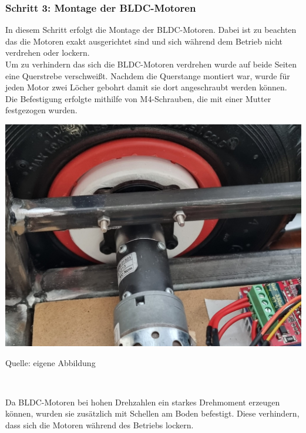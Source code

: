 \documentclass[ngerman,12pt,a4paper]{article}
\begin{document}
	\subsubsection*{Schritt 3: Montage der BLDC-Motoren}
	
	In diesem Schritt erfolgt die Montage der BLDC-Motoren. Dabei ist zu beachten das die Motoren exakt ausgerichtet sind und sich während dem Betrieb nicht verdrehen oder lockern.\\[0.7cm]
	Um zu verhindern das sich die BLDC-Motoren verdrehen wurde auf beide Seiten eine Querstrebe verschweißt. Nachdem die Querstange montiert war, wurde für jeden Motor zwei Löcher gebohrt damit sie dort angeschraubt werden können. Die Befestigung erfolgte mithilfe von M4-Schrauben, die mit einer Mutter festgezogen wurden.
	
	\begin{center} 
		\begin{minipage}[t]{0.33\textwidth}
			\includegraphics[scale=0.07]{Pictures/Motor-befestigung}
			\label{fig:modell-fertig}
			\vspace{-10pt}
			\begin{center}
				\par\small Quelle: eigene Abbildung 
			\end{center}
		\end{minipage} \\[0.75cm]
	\end{center} 
	Da BLDC-Motoren bei hohen Drehzahlen ein starkes Drehmoment erzeugen können, wurden sie zusätzlich mit Schellen am Boden befestigt. Diese verhindern, dass sich die Motoren während des Betriebs lockern.
	
\end{document}
